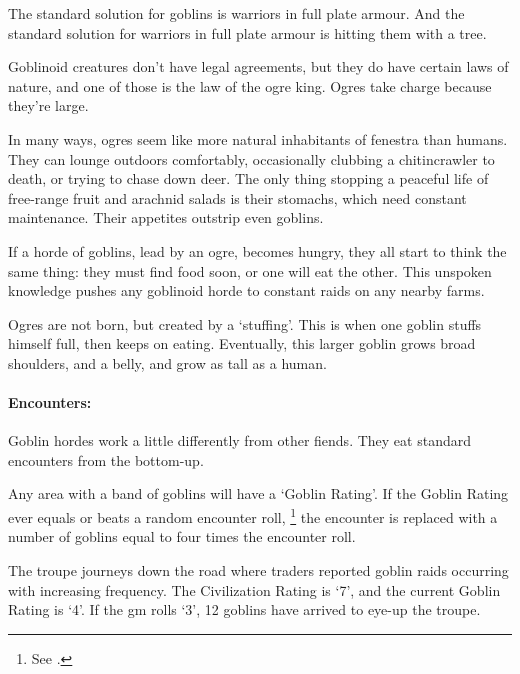 \begin{multicols}{2}

\noindent
The standard solution for goblins is warriors in full plate armour.
And the standard solution for warriors in full plate armour is hitting them with a tree.

Goblinoid creatures don't have legal agreements, but they do have certain laws of nature, and one of those is the law of the ogre king.
Ogres take charge because they're large.

In many ways, ogres seem like more natural inhabitants of \gls{fenestra} than humans.
They can lounge outdoors comfortably, occasionally clubbing a chitincrawler to death, or trying to chase down deer.
The only thing stopping a peaceful life of free-range fruit and arachnid salads is their stomachs, which need constant maintenance.
Their appetites outstrip even goblins.

If a horde of goblins, lead by an ogre, becomes hungry, they all start to think the same thing: they must find food soon, or one will eat the other.
This unspoken knowledge pushes any goblinoid horde to constant raids on any nearby farms.

Ogres are not born, but created by a `stuffing'.
This is when one goblin stuffs himself full, then keeps on eating.
Eventually, this larger goblin grows broad shoulders, and a belly, and grow as tall as a human.


\paragraph{Encounters:}

Goblin hordes work a little differently from other fiends.
They eat standard encounters from the bottom-up.

Any area with a band of goblins will have a `Goblin Rating'.
If the Goblin Rating ever equals or beats a random encounter roll,%
\footnote{See .}
the encounter is replaced with a number of goblins equal to four times the encounter roll.

\begin{exampletext}
  The troupe journeys down the road where traders reported goblin raids occurring with increasing frequency.
  The Civilization Rating is `7', and the current Goblin Rating is `4'.
  If the \gls{gm} rolls `3', 12 goblins have arrived to eye-up the troupe.
\end{exampletext}


\end{multicols}
